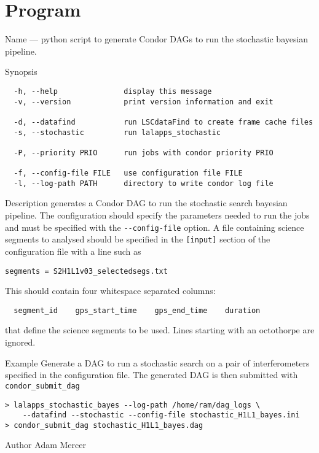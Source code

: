 \clearpage
\section{Program }
\label{program:stochastic-pipeline}

\begin{entry}
\item[Name]
 --- python script to generate Condor DAGs
to run the stochastic bayesian pipeline.

\item[Synopsis]
\begin{verbatim}
  -h, --help               display this message
  -v, --version            print version information and exit

  -d, --datafind           run LSCdataFind to create frame cache files
  -s, --stochastic         run lalapps_stochastic

  -P, --priority PRIO      run jobs with condor priority PRIO

  -f, --config-file FILE   use configuration file FILE
  -l, --log-path PATH      directory to write condor log file
\end{verbatim}

\item[Description]  generates a Condor
DAG to run the stochastic search bayesian pipeline. The configuration
should specify the parameters needed to run the jobs and must be
specified with the \verb$--config-file$ option. A file containing
science segments to analysed should be specified in the \verb$[input]$
section of the configuration file with a line such as

\begin{verbatim}
segments = S2H1L1v03_selectedsegs.txt
\end{verbatim}

This should contain
four whitespace separated columns:

\begin{verbatim}
  segment_id    gps_start_time    gps_end_time    duration
\end{verbatim}

that define the science segments to be used. Lines starting with an
octothorpe are ignored.

\item[Example]
Generate a DAG to run a stochastic search on a pair of interferometers
specified in the configuration file. The generated DAG is then submitted
with \texttt{condor\_submit\_dag}

\begin{verbatim}
> lalapps_stochastic_bayes --log-path /home/ram/dag_logs \
    --datafind --stochastic --config-file stochastic_H1L1_bayes.ini
> condor_submit_dag stochastic_H1L1_bayes.dag
\end{verbatim}

\item[Author]
Adam Mercer
\end{entry}


